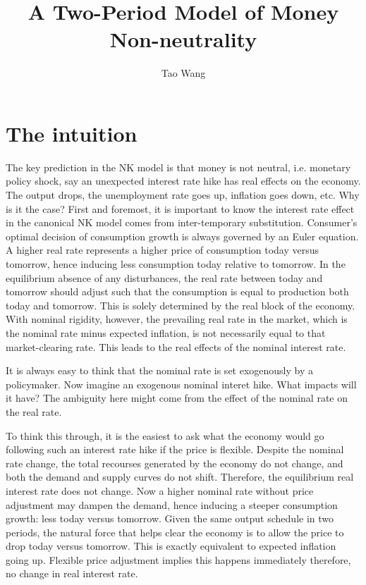 \documentclass[]{article}
\title{A Two-Period Model of Money Non-neutrality}
\author{Tao Wang}
\begin{document}
\maketitle

\section{The intuition}

The key prediction in the NK model is that money is not neutral, i.e. monetary policy shock, say an unexpected interest rate hike has real effects on the economy. The output drops, the unemployment rate goes up, inflation goes down, etc.  Why is it the case?
First and foremost, it is important to know the interest rate effect in the canonical NK model comes from inter-temporary substitution. Consumer’s optimal decision of consumption growth is always governed by an Euler equation. A higher real rate represents a higher price of consumption today versus tomorrow, hence inducing less consumption today relative to tomorrow. In the equilibrium absence of any disturbances, the real rate between today and tomorrow should adjust such that the consumption is equal to production both today and tomorrow. This is solely determined by the real block of the economy. With nominal rigidity, however, the prevailing real rate in the market, which is the nominal rate minus expected inflation, is not necessarily equal to that market-clearing rate. This leads to the real effects of the nominal interest rate. 

It is always easy to think that the nominal rate is set exogenously by a policymaker. Now imagine an  exogenous nominal interet hike. What impacts will it have? The ambiguity here might come from the effect of the nominal rate on the real rate.  

To think this through, it is the easiest to ask what the economy would go following such an interest rate hike if the price is flexible. Despite the nominal rate change, the total recourses generated by the economy do not change, and both the demand and supply curves do not shift. Therefore, the equilibrium real interest rate does not change. Now a higher nominal rate without price adjustment may dampen the demand, hence inducing a steeper consumption growth: less today versus tomorrow. Given the same output schedule in two periods, the natural force that helps clear the economy is to allow the price to drop today versus tomorrow. This is exactly equivalent to expected inflation going up. Flexible price adjustment implies this happens immediately therefore, no change in real interest rate. 
\end{document}
